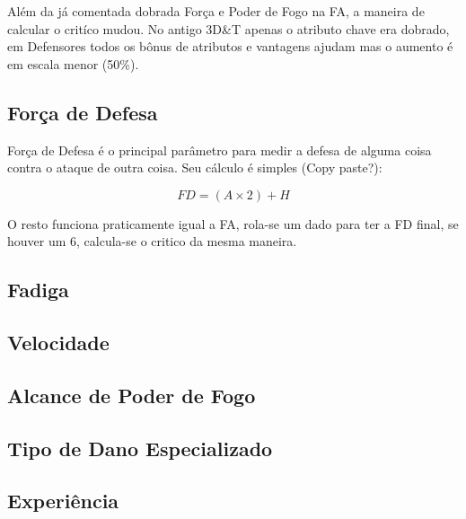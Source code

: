 \begin{framed}
Além da já comentada dobrada Força e Poder de Fogo na FA, a maneira de calcular o critíco mudou. No antigo 3D\&T apenas o atributo chave era dobrado, em Defensores todos os bônus de atributos e vantagens ajudam mas o aumento é em escala menor (50\%).
\end{framed}

\subsection{Força de Defesa}

Força de Defesa é o principal parâmetro para medir a defesa de alguma coisa contra o ataque de outra coisa. Seu cálculo é simples (Copy paste?):

\[ FD = (A \times 2) + H \]

O resto funciona praticamente igual a FA, rola-se um dado para ter a FD final, se houver um 6, calcula-se o critico da mesma maneira.

\subsection{Fadiga}

\subsection{Velocidade}

\subsection{Alcance de Poder de Fogo}

\subsection{Tipo de Dano Especializado}

\subsection{Experiência}
